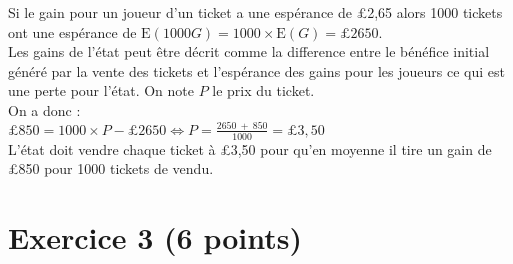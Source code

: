 \documentclass[a4paper, 12pt]{article}
\begin{document}
Si le gain pour un joueur d'un ticket a une espérance de £2,65 alors 1000 tickets ont une espérance de $\text{E}(1000G) = 1000\times \text{E}(G) = \pounds 2650$. 
\\
Les gains de l'état peut être décrit comme la difference entre le bénéfice initial généré par la vente des tickets et l'espérance des gains pour les joueurs ce qui est une perte pour l'état.
On note $P$ le prix du ticket. \\
On a donc : \\
$\pounds 850 = 1000 \times P - \pounds 2650 \iff P = \frac{2650\ +\ 850}{1000} = \pounds 3,50$ \\
L'état doit vendre chaque ticket à £3,50 pour qu'en moyenne il tire un gain de £850 pour 1000 tickets de vendu.
\vspace{1cm}

{}
\section*{Exercice 3 (6 points)}
\end{document}
